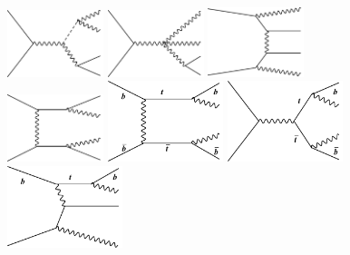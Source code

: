 \begin{figure}[tbp]
\begin{center}
 \includegraphics[width=0.25\textwidth,keepaspectratio]{figures/samples/feynEWKnonVBS3.pdf}
 \includegraphics[width=0.25\textwidth,keepaspectratio]{figures/samples/feynEWKnonVBS4.pdf}
 \includegraphics[width=0.25\textwidth,keepaspectratio]{figures/samples/feynEWKnonVBS5.pdf}
 \includegraphics[width=0.25\textwidth,keepaspectratio]{figures/samples/feynEWKnonVBS6.pdf}
 \includegraphics[width=0.3\textwidth,keepaspectratio]{figures/samples/feynEWKnonVBS1.pdf}
 \includegraphics[width=0.3\textwidth,keepaspectratio]{figures/samples/feynEWKnonVBS2.pdf}
 \includegraphics[width=0.3\textwidth,keepaspectratio]{figures/samples/feynEWKnonVBS7.pdf}
\label{fig:feynmanEWKnonVBS}
\end{center}
\end{figure}

